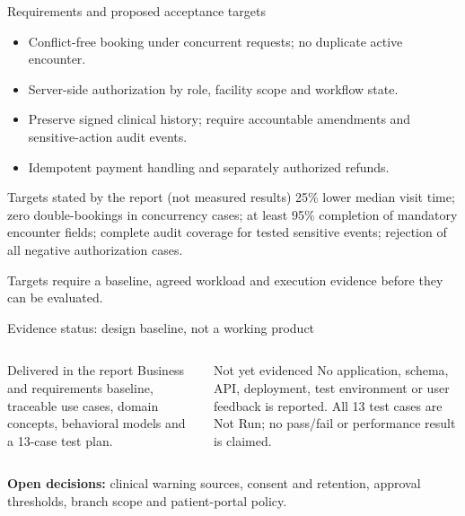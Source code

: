 ﻿\documentclass[aspectratio=169,10pt]{beamer}
\begin{document}
\begin{frame}{Requirements and proposed acceptance targets}
  \begin{itemize}
    \item Conflict-free booking under concurrent requests; no duplicate active encounter.
    \item Server-side authorization by role, facility scope and workflow state.
    \item Preserve signed clinical history; require accountable amendments and sensitive-action audit events.
    \item Idempotent payment handling and separately authorized refunds.
  \end{itemize}
  \vspace{.5em}
  \begin{block}{Targets stated by the report (not measured results)}
    25\% lower median visit time; zero double-bookings in concurrency cases; at least 95\% completion of mandatory encounter fields; complete audit coverage for tested sensitive events; rejection of all negative authorization cases.
  \end{block}
  \footnotesize Targets require a baseline, agreed workload and execution evidence before they can be evaluated.
\end{frame}

\begin{frame}{Evidence status: design baseline, not a working product}
  \begin{columns}[T,onlytextwidth]
      \begin{block}{Delivered in the report}
        Business and requirements baseline, traceable use cases, domain concepts, behavioral models and a 13-case test plan.
      \end{block}
      \begin{alertblock}{Not yet evidenced}
        No application, schema, API, deployment, test environment or user feedback is reported. All 13 test cases are Not Run; no pass/fail or performance result is claimed.
      \end{alertblock}
  \end{columns}
  \vspace{.4em}
  \textbf{Open decisions:} clinical warning sources, consent and retention, approval thresholds, branch scope and patient-portal policy.
\end{frame}
\end{document}
